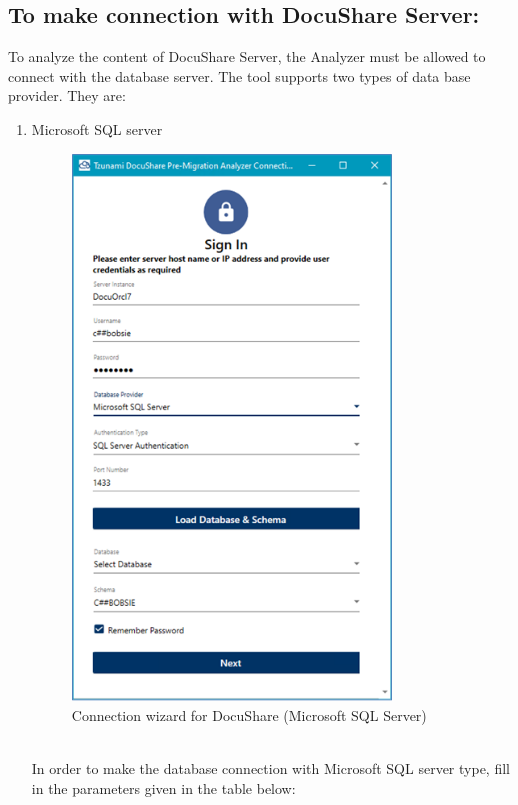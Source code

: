 \subsection*{To make connection with DocuShare Server:}
To analyze the content of DocuShare Server, the Analyzer must be allowed to connect with the database server. The tool supports two types of data base provider. They are:
\begin{enumerate}
	\item Microsoft SQL server
	\begin{figure} 
		\centering
		\includegraphics[width=0.8\textwidth]{Images/DsConnectonMsSql.png}
		\caption{Connection wizard for DocuShare (Microsoft SQL Server)}
	\end{figure}\\
{In order to make the database connection with Microsoft SQL server type, fill in the parameters given in the table below:}
	\end{enumerate}
